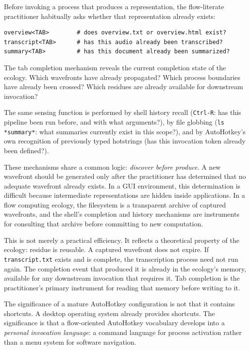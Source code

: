 \documentclass[12pt, a4paper]{article}
\begin{document}
Before invoking a process that produces a representation, the
flow-literate practitioner habitually asks whether that
representation already exists:

\begin{lstlisting}
overview<TAB>        # does overview.txt or overview.html exist?
transcript<TAB>      # has this audio already been transcribed?
summary<TAB>         # has this document already been summarized?
\end{lstlisting}

The tab completion mechanism reveals the current completion state
of the ecology. Which wavefronts have already propagated? Which
process boundaries have already been crossed? Which residues are
already available for downstream invocation?

The same sensing function is performed by shell history recall
(\texttt{Ctrl-R}: has this pipeline been run before, and with
what arguments?), by file globbing (\texttt{ls *summary*}: what
summaries currently exist in this scope?), and by AutoHotkey's
own recognition of previously typed hotstrings (has this
invocation token already been defined?).

These mechanisms share a common logic: \emph{discover before
produce}. A new wavefront should be generated only after the
practitioner has determined that no adequate wavefront already
exists. In a GUI environment, this determination is difficult
because intermediate representations are hidden inside
applications. In a flow computing ecology, the filesystem is
a transparent archive of captured wavefronts, and the shell's
completion and history mechanisms are instruments for consulting
that archive before committing to new computation.

This is not merely a practical efficiency. It reflects a
theoretical property of the ecology: residue is reusable.
A captured wavefront does not expire. If \texttt{transcript.txt}
exists and is complete, the transcription process need not run
again. The completion event that produced it is already in the
ecology's memory, available for any downstream invocation that
requires it. Tab completion is the practitioner's primary
instrument for reading that memory before writing to it.

The significance of a mature AutoHotkey configuration is not that
it contains shortcuts. A desktop operating system already provides
shortcuts. The significance is that a flow-oriented AutoHotkey
vocabulary develops into a \emph{personal invocation language}:
a command language for process activation rather than a menu system
for software navigation.
\end{document}
